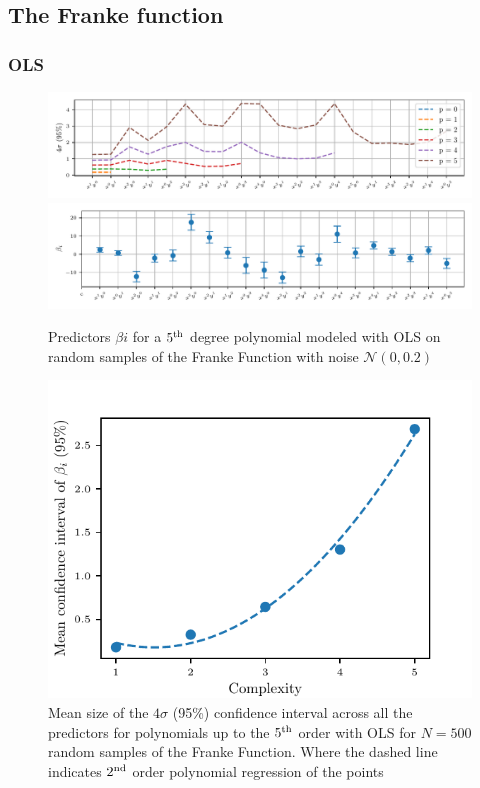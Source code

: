 \documentclass[reprint, english, nofootinbib]{revtex4-2}
\begin{document}
\subsection{The Franke function}

    \subsubsection{OLS}

    \begin{figure}
        \centering
        \includegraphics[width=2\columnwidth]{beta_confidence_interval_size_OLS.pdf}
        \includegraphics[width=2\columnwidth]{beta_confidence_interval_OLS.pdf}
        \caption{\label{fig:confidence intervals}Predictors $\beta{i}$ for a $5^{\textup{th}}$ degree polynomial modeled with OLS on random samples of the Franke Function with noise $\mathcal{N}(0, 0.2)$}
    \end{figure}

    \begin{figure}
        \centering
        \includegraphics[width=\columnwidth]{Franke_mean_confidence_interval.pdf}
        \caption{Mean size of the $4\sigma$ (95\%) confidence interval across all the predictors for polynomials up to the $5^{\textup{th}}$ order with OLS for $N=500$ random samples of the Franke Function. Where the dashed line indicates $2^\textup{nd}$ order polynomial regression of the points}
    \end{figure}
\end{document}
